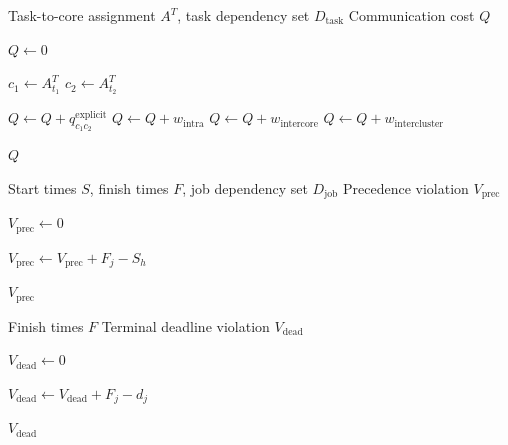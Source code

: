 \documentclass{article}
\begin{document}
\begin{algorithm}[H]
    \caption{Communication Cost}
    \label{alg:communication_cost}
    \begin{algorithmic}[1]
        \Require Task-to-core assignment $A^T$, task dependency set $D_{\mathrm{task}}$
        \Ensure Communication cost $Q$

        \State $Q \gets 0$

            \State $c_1 \gets A^T_{t_1}$
            \State $c_2 \gets A^T_{t_2}$

                \State $Q \gets Q + q^{\mathrm{explicit}}_{c_1c_2}$
                \State $Q \gets Q + w_{\mathrm{intra}}$
                \State $Q \gets Q + w_{\mathrm{intercore}}$
            \Else
                \State $Q \gets Q + w_{\mathrm{intercluster}}$
            \EndIf
        \EndFor

        \State \Return $Q$
    \end{algorithmic}
\end{algorithm}

\begin{algorithm}[H]
    \caption{Precedence Violation}
    \label{alg:precedence_violation}
    \begin{algorithmic}[1]
        \Require Start times $S$, finish times $F$, job dependency set $D_{\mathrm{job}}$
        \Ensure Precedence violation $V_{\mathrm{prec}}$

        \State $V_{\mathrm{prec}} \gets 0$

                \State $V_{\mathrm{prec}} \gets V_{\mathrm{prec}} + F_j - S_h$
            \EndIf
        \EndFor

        \State \Return $V_{\mathrm{prec}}$
    \end{algorithmic}
\end{algorithm}

\begin{algorithm}[H]
    \caption{Terminal Deadline Violation}
    \label{alg:terminal_deadline_violation}
    \begin{algorithmic}[1]
        \Require Finish times $F$
        \Ensure Terminal deadline violation $V_{\mathrm{dead}}$

        \State $V_{\mathrm{dead}} \gets 0$

                \State $V_{\mathrm{dead}} \gets V_{\mathrm{dead}} + F_j - d_j$
            \EndIf
        \EndFor

        \State \Return $V_{\mathrm{dead}}$
    \end{algorithmic}
\end{algorithm}
\end{document}

